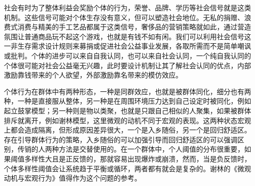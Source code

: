 \documentclass[]{tufte-book}
\begin{document}
社会有时为了整体利益会奖励个体的行为，荣誉、品牌、学历等社会信号就是这类机制。这些信号可能对个体生存没有意义，但可以塑造社会地位。无私的捐赠、浪费式消费与精美的手工艺品都属于这类信号，奢侈品的营销策略就如此，通过营造氛围让普通商品玩不起这个游戏，也就是有钱不如有闲。我们可以利用社会信号这一非生存需求设计规则来募捐或促进社会公益事业发展，各取所需而不是简单嘲讽或批判。个体的进步可以来自自我认同，也可以来自社会认同，一个纯自我认同的个体很可能对社会公益毫无兴趣，此时要设计机制让其了解社会认同的优点，内部激励靠钱带来的个人欲望，外部激励靠名带来的模仿效应。

个体行为在群体中有两种形态，一种是同群效应，也就是被群体同化，细分也有两种，一种是直接服从整体，另一种是在周围环境压力达到自己设定时被同化，例如起立鼓掌模型；另一种则是物以类聚，也就是只跟自己相似的人聚集，如果被群体排斥就离开，例如谢林模型，这里微观的动机不同于宏观的表现。这两种状态宏观上都会造成隔离，但形成原因差异很大，一个是入乡随俗，另一个是回归舒适区。存在引导群体行为的策略，入乡随俗的可以加强引导而回归舒适区的可以强调区别，传销的人两种方法是交替使用的。在一个群体中，个人阈值的分布很重要，如果阈值多样性大且是正反馈的，那就容易出现爆炸或崩溃，然而，当是负反馈时，个体多样性阈值会让系统趋于平衡或循环，两者都有就会是复杂的。谢林的《微观动机与宏观行为》值得作为这个问题的参考。
\end{document}
